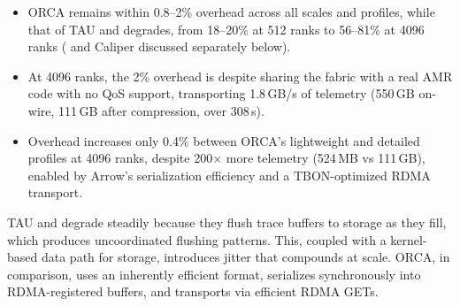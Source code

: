 \begin{itemize}[leftmargin=*]
  \item ORCA remains within 0.8--2\% overhead across all scales and profiles, while that of TAU and
        \dftracer{} degrades, from 18--20\% at 512 ranks to 56--81\% at 4096 ranks
        (\scorep{} and Caliper discussed separately below).
  \item At 4096 ranks, the 2\% overhead is despite sharing the fabric with a real AMR code with no QoS support, transporting 1.8\,GB/s of telemetry (550\,GB on-wire, 111\,GB after compression, over 308\,s).
  \item Overhead increases only 0.4\% between ORCA's lightweight and detailed profiles at 4096 ranks, despite 200$\times$ more telemetry (524\,MB vs 111\,GB), enabled by Arrow's serialization efficiency and a TBON-optimized RDMA transport.
\end{itemize}

TAU and \dftracer{} degrade steadily because they flush trace buffers to storage as they fill,
which produces uncoordinated flushing patterns.
This, coupled with a kernel-based data path for storage, introduces jitter that compounds at scale.
ORCA, in comparison, uses an inherently efficient format, serializes synchronously into
RDMA-registered buffers, and transports via efficient RDMA GETs.

